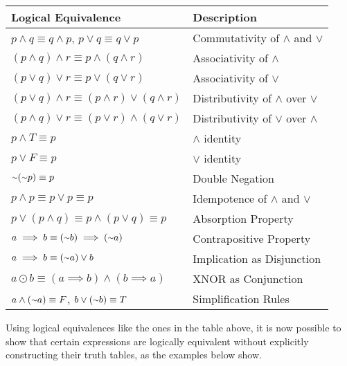 \begin{table}[h]
\centering
\begin{tabular}{|l|l|}
\hline
Logical Equivalence & Description \\ \hline
$p \land q \equiv q \land p$, $p \lor q \equiv q \lor p$ & Commutativity of $\land$ and $\lor$\\ \hline
$(p \land q) \land r \equiv p \land (q \land r)$ & Associativity of $\land$\\ \hline
$(p \lor q) \lor r \equiv p \lor (q \lor r)$ & Associativity of $\lor$ \\ \hline
$(p \lor q) \land r \equiv (p \land r) \lor (q \land r) $ & Distributivity of $\land$ over $\lor$ \\ \hline
$(p \land q) \lor r \equiv (p \lor r) \land (q \lor r) $ & Distributivity of $\lor$ over $\land$ \\ \hline
$p \land T \equiv p$ & $\land$ identity \\ \hline
$p \lor F \equiv p$ & $\lor$ identity \\ \hline
$\shortsim(\shortsim p) \equiv p$ & Double Negation \\ \hline
$p \land p \equiv p \lor p \equiv p$ & Idempotence of $\land$ and $\lor$ \\ \hline
$p \lor (p \land q) \equiv p \land (p \lor q) \equiv p$ & Absorption Property \\ \hline
$a \implies b \equiv (\shortsim b) \implies (\shortsim a)$ & Contrapositive Property \\ \hline
$a \implies b \equiv (\shortsim a) \lor b$ & Implication as Disjunction \\ \hline
$a \odot b \equiv (a \implies b) \land (b \implies a)$ & XNOR as Conjunction \\ \hline
$a \land (\shortsim a) \equiv F$, $b \lor (\shortsim b) \equiv T$ & Simplification Rules \\ \hline
\end{tabular}
\end{table}

Using logical equivalences like the ones in the table above, it is now possible to show that certain expressions are logically equivalent without explicitly constructing their truth tables, as the examples below show.

